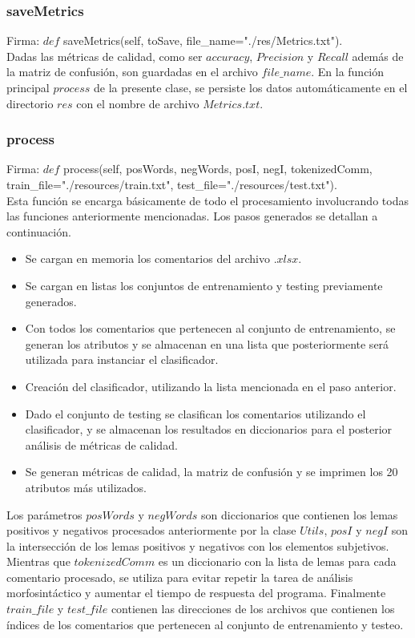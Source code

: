 \documentclass[12pt]{article}
\begin{document}
\subsubsection{saveMetrics}
Firma: $def$ saveMetrics(self, toSave, file\_name="./res/Metrics.txt"). \\
Dadas las métricas de calidad, como ser $accuracy$, $Precision$ y $Recall$ además de la matriz de confusión, son guardadas en el archivo $file\_name$. En la función principal $process$ de la presente clase, se persiste los datos automáticamente en el directorio $res$ con el nombre de archivo $Metrics.txt$.


\subsubsection{process}
Firma: $def$ process(self, posWords, negWords, posI, negI, tokenizedComm, train\_file="./resources/train.txt", test\_file="./resources/test.txt"). \\
Esta función se encarga básicamente de todo el procesamiento involucrando todas las funciones anteriormente mencionadas. Los pasos generados se detallan a continuación.
\begin{itemize}
  \item Se cargan en memoria los comentarios del archivo $.xlsx$.
  \item Se cargan en listas los conjuntos de entrenamiento y testing previamente generados.
  \item Con todos los comentarios que pertenecen al conjunto de entrenamiento, se generan los atributos y se almacenan en una lista que posteriormente será utilizada para instanciar el clasificador.
  \item Creación del clasificador, utilizando la lista mencionada en el paso anterior.
  \item Dado el conjunto de testing se clasifican los comentarios utilizando el clasificador, y se almacenan los resultados en diccionarios para el posterior análisis de métricas de calidad.
  \item Se generan métricas de calidad, la matriz de confusión y se imprimen los 20 atributos más utilizados.
\end{itemize}

Los parámetros $posWords$ y $negWords$ son diccionarios que contienen los lemas positivos y negativos procesados anteriormente por la clase $Utils$, $posI$ y $negI$ son la intersección de los lemas positivos y negativos con los elementos subjetivos. Mientras que $tokenizedComm$ es un diccionario con la lista de lemas para cada comentario procesado, se utiliza para evitar repetir la tarea de análisis morfosintáctico y aumentar el tiempo de respuesta del programa. Finalmente $train\_file$ y $test\_file$ contienen las direcciones de los archivos que contienen los índices de los comentarios que pertenecen al conjunto de entrenamiento y testeo.
\end{document}
